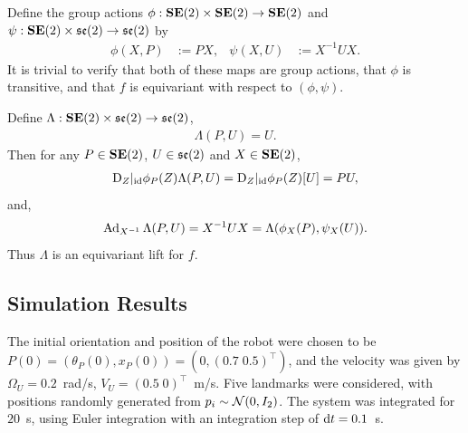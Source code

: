 \documentclass{article}
\begin{document}
Define the group actions $\phi: \mathbf{SE}(2) \times \mathbf{SE}(2) \to \mathbf{SE}(2)$ and $\psi: \mathbf{SE}(2) \times \mathfrak{se}(2) \to \mathfrak{se}(2)$ by
\begin{align*}
    \phi(X, P) &:= PX, &
    \psi(X, U) &:= X^{-1} U X.
\end{align*}
It is trivial to verify that both of these maps are group actions, that $\phi$ is transitive, and that $f$ is equivariant with respect to $(\phi, \psi)$.

Define $\Lambda : \mathbf{SE}(2) \times \mathfrak{se}(2) \to \mathfrak{se}(2)$,
\begin{align*}
    \Lambda(P, U) = U.
\end{align*}
Then for any $P \in \mathbf{SE}(2)$, $U \in \mathfrak{se}(2)$ and $X \in \mathbf{SE}(2)$,
\begin{align*}
    \mathrm{D}_Z |_{\mathrm{id}} \phi_P(Z) \Lambda(P, U)
    = \mathrm{D}_Z |_{\mathrm{id}} \phi_P(Z) [U]
    = P U,
\end{align*}
and,
\begin{align*}
    \operatorname{Ad}_{X^{-1}} \Lambda(P, U)
    = X^{-1} U X
    = \Lambda(\phi_X(P), \psi_X(U)).
\end{align*}
Thus $\Lambda$ is an equivariant lift for $f$.

\subsection{Simulation Results}

The initial orientation and position of the robot were chosen to be $P(0) = (\theta_P(0), x_P(0)) = (0, (0.7 \; 0.5)^\top)$, and the velocity was given by $\Omega_U = 0.2$~rad/s, $V_U = (0.5 \; 0)^\top$~m/s. 
Five landmarks were considered, with positions randomly generated from $p_i \sim \mathcal{N}(0, I_2)$.
The system was integrated for $20$~s, using Euler integration with an integration step of $\mathrm{d} t = 0.1$~s.
\end{document}
